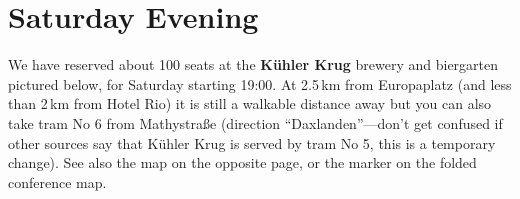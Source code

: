 \newpage\ClearWallPaper

\label{kuehler-krug}
\cropmarkswallpaper

\newpage
{}
\thispagestyle{empty}
\section*{Saturday Evening}

We have reserved about 100 seats at the \textbf{Kühler Krug} brewery
and biergarten pictured below, for Saturday starting 19:00. At
2.5\,km from Europaplatz (and less than 2\,km from Hotel Rio) it is
still a walkable distance away but you can also take tram No 6
from Mathystraße (direction ``Daxlanden''---don't get confused if
other sources say that Kühler Krug is served by tram No 5, this is
a temporary change). See also the map on the opposite page, or
the marker on the folded conference map.
\cropmarkswallpaper
